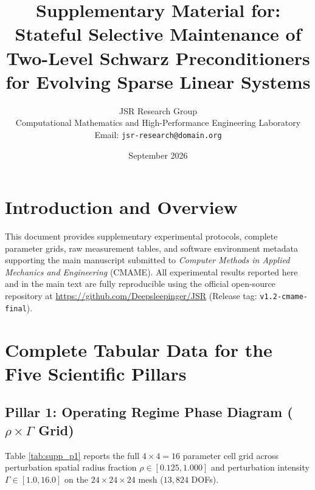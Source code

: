 \documentclass[11pt,a4paper]{article}
\title{\textbf{Supplementary Material for:\\
Stateful Selective Maintenance of Two-Level Schwarz Preconditioners for Evolving Sparse Linear Systems}}
\author{JSR Research Group\\
\normalsize Computational Mathematics and High-Performance Engineering Laboratory\\
\normalsize Email: \texttt{jsr-research@domain.org}}
\date{September 2026}
\begin{document}
\maketitle

\section{Introduction and Overview}
This document provides supplementary experimental protocols, complete parameter grids, raw measurement tables, and software environment metadata supporting the main manuscript submitted to \textit{Computer Methods in Applied Mechanics and Engineering} (CMAME). All experimental results reported here and in the main text are fully reproducible using the official open-source repository at \url{https://github.com/Deepsleepinger/JSR} (Release tag: \texttt{v1.2-cmame-final}).

\section{Complete Tabular Data for the Five Scientific Pillars}

\subsection{Pillar 1: Operating Regime Phase Diagram ($\rho \times \Gamma$ Grid)}
Table \ref{tab:supp_p1} reports the full $4 \times 4 = 16$ parameter cell grid across perturbation spatial radius fraction $\rho \in [0.125, 1.000]$ and perturbation intensity $\Gamma \in [1.0, 16.0]$ on the $24 \times 24 \times 24$ mesh ($13,824$ DOFs).
\end{document}
